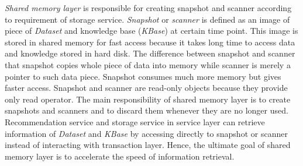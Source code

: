 \documentclass[a4paper,twoside]{article}
\begin{document}
\textit{Shared memory layer} is responsible for creating snapshot and scanner according to requirement of storage service. \textit{Snapshot} or \textit{scanner} is defined as an image of piece of \textit{Dataset} and knowledge base (\textit{KBase}) at certain time point. This image is stored in shared memory for fast access because it takes long time to access data and knowledge stored in hard disk. The difference between snapshot and scanner that snapshot copies whole piece of data into memory while scanner is merely a pointer to such data piece. Snapshot consumes much more memory but gives faster access. Snapshot and scanner are read-only objects because they provide only read operator. The main responsibility of shared memory layer is to create snapshots and scanners and to discard them whenever they are no longer used. Recommendation service and storage service in service layer can retrieve information of \textit{Dataset} and \textit{KBase} by accessing directly to snapshot or scanner instead of interacting with transaction layer. Hence, the ultimate goal of shared memory layer is to accelerate the speed of information retrieval.
\end{document}
